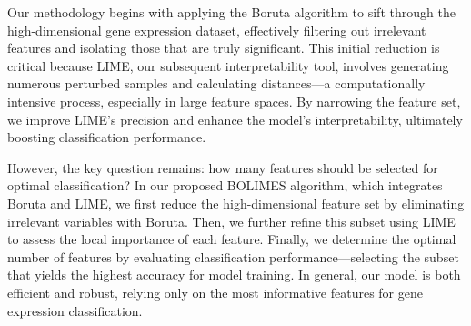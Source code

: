 Our methodology begins with applying the Boruta algorithm to sift through the high-dimensional gene expression dataset, effectively filtering out irrelevant features and isolating those that are truly significant. This initial reduction is critical because LIME, our subsequent interpretability tool, involves generating numerous perturbed samples and calculating distances—a computationally intensive process, especially in large feature spaces. By narrowing the feature set, we improve LIME's precision and enhance the model's interpretability, ultimately boosting classification performance.

However, the key question remains: how many features should be selected for optimal classification? In our proposed BOLIMES algorithm, which integrates Boruta and LIME, we first reduce the high-dimensional feature set by eliminating irrelevant variables with Boruta. Then, we further refine this subset using LIME to assess the local importance of each feature. Finally, we determine the optimal number of features by evaluating classification performance—selecting the subset that yields the highest accuracy for model training. In general, our model is both efficient and robust, relying only on the most informative features for gene expression classification.

